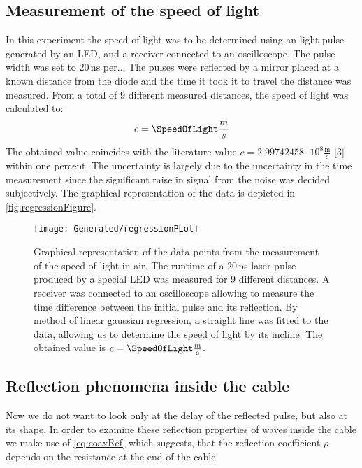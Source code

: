 \documentclass[a4paper,10pt,twocolumn]{article}
\begin{document}
    \subsection{Measurement of the speed of light}
    \label{subsec:speedOfLightMeasurement}
    In this experiment the speed of light was to be determined using an light pulse generated by an LED, and a receiver connected to an oscilloscope.
    The pulse width was set to $20\,$ns per...
    The pulses were reflected by a mirror placed at a known distance from the diode and the time it took it to travel the distance was measured.
    From a total of 9 different measured distances, the speed of light was calculated to:
    \begin{align}
        c = \SpeedOfLight \frac{m}{s}
    \end{align}
    The obtained value coincides with the literature value $c  = 2.99742458\cdot10^8 \frac{\text{m}}{\text{s}}$ [3] within one percent.
    The uncertainty is largely due to the uncertainty in the time measurement since the significant raise in signal from the noise was decided subjectively.
    The graphical representation of the data is depicted in \autoref{fig:regressionFigure}.
    \begin{figure}
        \begin{center}
            \texttt{[image: Generated/regressionPLot]}
            \caption[]{Graphical representation of the data-points from the measurement of the speed of light in air.
            The runtime of a $20\,$ns laser pulse produced by a special LED was measured for 9 different distances.
            A receiver was connected to an oscilloscope allowing to measure the time difference between the initial pulse and its reflection.
            By method of linear gaussian regression, a straight line was fitted to the data, allowing us to determine the speed of light by its incline.
            The obtained value is $c =\SpeedOfLight \frac{\text{m}}{\text{s}}$.
            }
            \label{fig:regressionFigure}
        \end{center}
    \end{figure}
    \label{sec:reflectionProperties}
    \subsection{Reflection phenomena inside the cable}
    Now we do not want to look only at the delay of the reflected pulse, but also at its shape.
    In order to examine these reflection properties of waves inside the cable we make use of \autoref{eq:coaxRef} which suggests, that the reflection
    coefficient $\rho$ depends on the resistance at the end of the cable.
    
\end{document}

